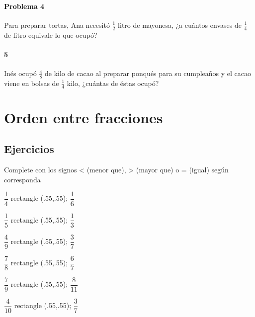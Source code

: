 \documentclass[10pt,twoside]{article}
\begin{document}
\paragraph*{Problema 4}
Para preparar tortas, Ana necesitó $\frac{1}{2}$ litro de mayonesa, ¿a cuántos envases de $\frac{1}{4}$ de litro equivale lo que ocup\'{o}?
\paragraph*{5}
Inés ocupó $\frac{4}{8}$ de kilo de cacao al preparar ponqués para su cumpleaños y el cacao viene en bolsas de $\frac{1}{4}$ kilo, ¿cuántas de éstas ocupó?
\section*{Orden entre fracciones}
\subsection*{Ejercicios}
Complete con los signos < (menor que), > (mayor que) o = (igual) según corresponda
\begin{itemize}
\begin{multicols}{3}
\item $\dfrac{1}{4}$ \tikz \draw rectangle (.55,.55); $\dfrac{1}{6}$
\item $\dfrac{1}{5}$ \tikz \draw rectangle (.55,.55); $\dfrac{1}{3}$
\item $\dfrac{4}{9}$ \tikz \draw rectangle (.55,.55); $\dfrac{3}{7}$
\item $\dfrac{7}{8}$ \tikz \draw rectangle (.55,.55); $\dfrac{6}{7}$
\item $\dfrac{7}{9}$ \tikz \draw rectangle (.55,.55); $\dfrac{8}{11}$ 
\item $\dfrac{4}{10}$ \tikz \draw rectangle (.55,.55); $\dfrac{3}{7}$
\end{multicols}
\end{itemize}
\end{document}
